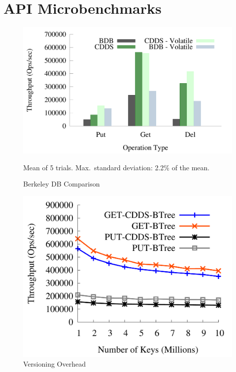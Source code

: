 \section{API Microbenchmarks}
\label{sec:api_microbench}

\begin{figure}[t]
\begin{minipage}[b]{0.49\textwidth}
\centerline{\includegraphics[width=\columnwidth]{figs/bdb-bench}}
\begin{captiontext}
\centerline{Mean of 5 trials. Max.\ standard deviation:
  2.2\% of the mean.}
\end{captiontext}
\caption{Berkeley DB Comparison}
\label{fig:bdb}
\end{minipage}
\begin{minipage}[b]{0.49\textwidth}
\centerline{\includegraphics[width=0.85\columnwidth]{figs/versioning}}
\caption{Versioning Overhead}
\label{fig:overhead}
\end{minipage}
\end{figure}

